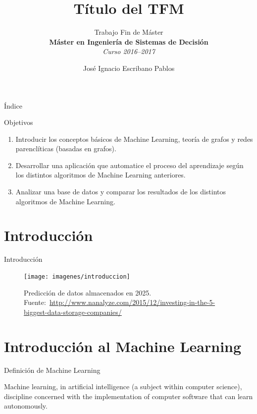 \documentclass[hyperref={unicode}]{beamer}
\title{Título del TFM}
\subtitle{Trabajo Fin de Máster \\ \textbf{Máster en Ingeniería de Sistemas de Decisión} \\ \textit{Curso 2016--2017}}
\author{José Ignacio Escribano Pablos}
\institute{\begin{tabular}{c}
Ana Elizabeth García Sipols \\
Miguel Romance del Río     
\end{tabular}}
\begin{document}
\setcounter{showProgressBar}{0}
\setcounter{showSlideNumbers}{0}

\frame{\titlepage}

\begin{frame}{Índice}
	\tableofcontents
\end{frame}

\setcounter{framenumber}{0}
\setcounter{showProgressBar}{1}
\setcounter{showSlideNumbers}{1}

\begin{frame}{Objetivos}
	\begin{enumerate}
		\item Introducir los conceptos básicos de Machine Learning, teoría de grafos y redes parenclíticas (basadas en grafos).
		
		\item \pause Desarrollar una aplicación que automatice el proceso del aprendizaje según los distintos algoritmos de Machine Learning anteriores.
		
		\item \pause Analizar una base de datos y comparar los resultados de los distintos algoritmos de Machine Learning.
	\end{enumerate}
\end{frame}

\section{Introducción}
\begin{frame}{Introducción}
	\begin{figure}
			\begin{center}
			\texttt{[image: imagenes/introduccion]}
			\caption{Predicción de datos almacenados en 2025. Fuente:~\url{http://www.nanalyze.com/2015/12/investing-in-the-5-biggest-data-storage-companies/}}
			\end{center}
		\end{figure}
\end{frame}

\section{Introducción al Machine Learning}
\begin{frame}{Definición de Machine Learning}
	\begin{fancyquotes}
		Machine learning, in artificial intelligence (a subject within computer science), discipline concerned with the implementation of computer software that can learn autonomously.
	\end{fancyquotes}
\end{frame}
\end{document}
